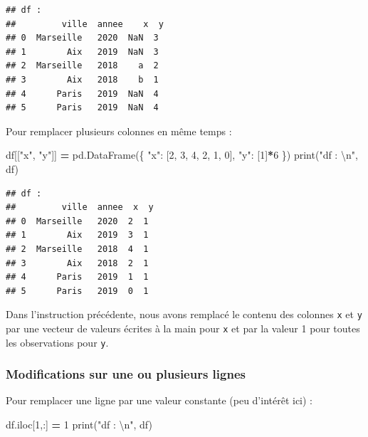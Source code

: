 \documentclass[
  12pt,
]{book}
\newenvironment{Shaded}{\begin{snugshade}}{\end{snugshade}}
\newcommand{\BuiltInTok}[1]{#1}
\newcommand{\CharTok}[1]{\textcolor[rgb]{0.31,0.60,0.02}{#1}}
\newcommand{\DecValTok}[1]{\textcolor[rgb]{0.00,0.00,0.81}{#1}}
\newcommand{\NormalTok}[1]{#1}
\newcommand{\OperatorTok}[1]{\textcolor[rgb]{0.81,0.36,0.00}{\textbf{#1}}}
\newcommand{\StringTok}[1]{\textcolor[rgb]{0.31,0.60,0.02}{#1}}
\numberwithin{equation}{section}
\numberwithin{countremarque}{section}
\begin{document}
\begin{lstlisting}
## df : 
##         ville  annee    x  y
## 0  Marseille   2020  NaN  3
## 1        Aix   2019  NaN  3
## 2  Marseille   2018    a  2
## 3        Aix   2018    b  1
## 4      Paris   2019  NaN  4
## 5      Paris   2019  NaN  4
\end{lstlisting}

Pour remplacer plusieurs colonnes en même temps :

\begin{Shaded}
\begin{Highlighting}[]
\NormalTok{df[[}\StringTok{"x"}\NormalTok{, }\StringTok{"y"}\NormalTok{]] }\OperatorTok{=}\NormalTok{ pd.DataFrame(\{}
    \StringTok{"x"}\NormalTok{: [}\DecValTok{2}\NormalTok{, }\DecValTok{3}\NormalTok{, }\DecValTok{4}\NormalTok{, }\DecValTok{2}\NormalTok{, }\DecValTok{1}\NormalTok{, }\DecValTok{0}\NormalTok{],}
    \StringTok{"y"}\NormalTok{: [}\DecValTok{1}\NormalTok{]}\OperatorTok{*}\DecValTok{6}
\NormalTok{\})}
\BuiltInTok{print}\NormalTok{(}\StringTok{"df : }\CharTok{\textbackslash{}n}\StringTok{"}\NormalTok{, df)}
\end{Highlighting}
\end{Shaded}

\begin{lstlisting}
## df : 
##         ville  annee  x  y
## 0  Marseille   2020  2  1
## 1        Aix   2019  3  1
## 2  Marseille   2018  4  1
## 3        Aix   2018  2  1
## 4      Paris   2019  1  1
## 5      Paris   2019  0  1
\end{lstlisting}

Dans l'instruction précédente, nous avons remplacé le contenu des colonnes \texttt{x} et \texttt{y} par une vecteur de valeurs écrites à la main pour \texttt{x} et par la valeur 1 pour toutes les observations pour \texttt{y}.

\subsubsection{Modifications sur une ou plusieurs lignes}\label{modifications-sur-une-ou-plusieurs-lignes}

Pour remplacer une ligne par une valeur constante (peu d'intérêt ici) :

\begin{Shaded}
\begin{Highlighting}[]
\NormalTok{df.iloc[}\DecValTok{1}\NormalTok{,:] }\OperatorTok{=} \DecValTok{1}
\BuiltInTok{print}\NormalTok{(}\StringTok{"df : }\CharTok{\textbackslash{}n}\StringTok{"}\NormalTok{, df)}
\end{Highlighting}
\end{Shaded}
\end{document}
